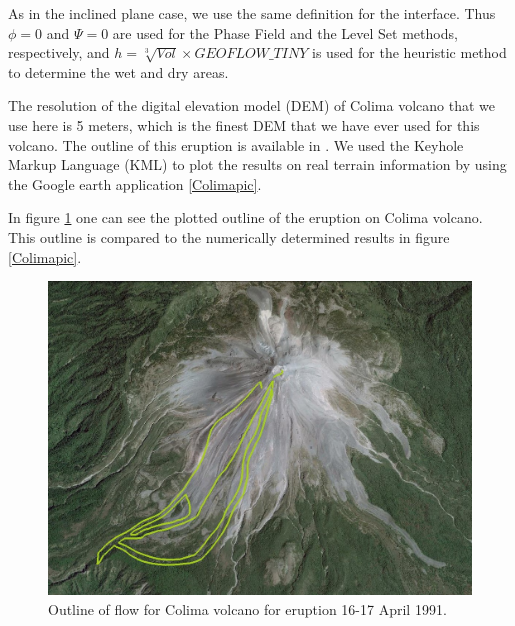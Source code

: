 \documentclass[review]{elsarticle}
\begin{document}
As in the inclined plane case, we use the same definition for the interface.
Thus $\phi=0$ and $\varPsi=0$ are used for the Phase Field and the Level Set methods, respectively, and $h=\sqrt[3]{Vol} \times GEOFLOW\_TINY $ 
is used for the heuristic method to determine the wet and dry areas.
 
The resolution of the digital elevation model (DEM) of Colima volcano that we use here is 5 meters, which is the finest DEM 
that we have ever used for this volcano.
The outline of this eruption is available in \cite{NamikawaPhD}.
We used the Keyhole Markup Language (KML) to plot the results on real terrain information by using the Google earth application \ref{Colimapic}. 

In figure \ref{colima_outline} one can see the plotted outline of the eruption on Colima volcano. 
This outline is compared to the numerically determined results in figure \ref{Colimapic}.

\begin{figure}[H]
\centering
\includegraphics[width=.5\textwidth]{IMAGES/outline1.jpg}
\caption{Outline of flow for Colima volcano for eruption 16-17 April 1991.}
 \label{colima_outline}

\end{figure}
\end{document}
